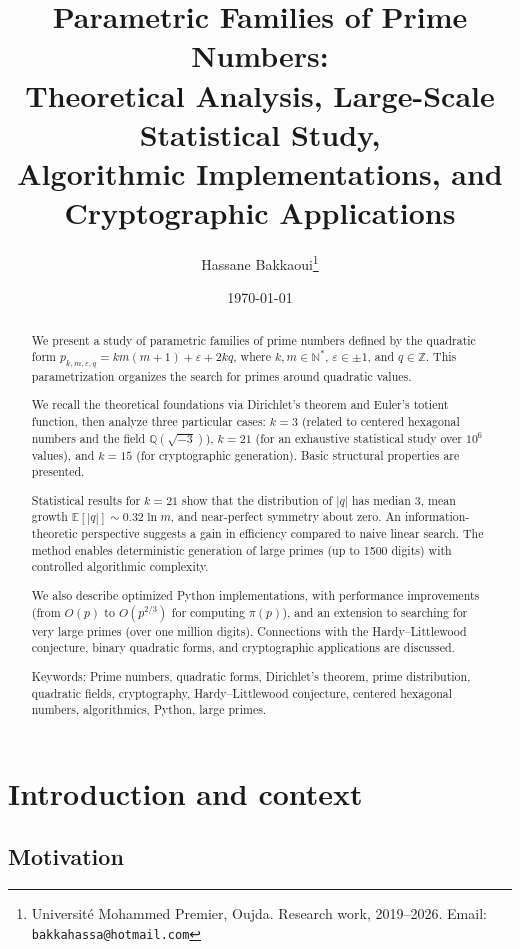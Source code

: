 \documentclass[11pt,a4paper]{article}
\title{\textbf{Parametric Families of Prime Numbers:\\ 
Theoretical Analysis, Large-Scale Statistical Study,\\
Algorithmic Implementations, and Cryptographic Applications}}
\author{Hassane Bakkaoui\thanks{Universit\'e Mohammed Premier, Oujda. Research work, 2019--2026. Email: \texttt{bakkahassa@hotmail.com}}}
\date{\today}
\theoremstyle{definition}
\theoremstyle{plain}
\newcommand{\N}{\mathbb{N}}
\newcommand{\Z}{\mathbb{Z}}
\newcommand{\Q}{\mathbb{Q}}
\def\{{}%
\def\}{}%
\def\textbf#1{#1}%
\begin{document}
\maketitle

\begin{abstract}
We present a study of parametric families of prime numbers defined by the quadratic form $p_{k,m,\varepsilon,q} = km(m+1) + \varepsilon + 2kq$, where $k,m \in \N^{*}$, $\varepsilon \in \{\pm 1\}$, and $q \in \Z$. This parametrization organizes the search for primes around quadratic values.

We recall the theoretical foundations via Dirichlet's theorem and Euler's totient function, then analyze three particular cases: $k=3$ (related to centered hexagonal numbers and the field $\Q(\sqrt{-3})$), $k=21$ (for an exhaustive statistical study over $10^6$ values), and $k=15$ (for cryptographic generation). Basic structural properties are presented.

Statistical results for $k=21$ show that the distribution of $|q|$ has median $3$, mean growth $\mathbb{E}[|q|] \sim 0.32\ln m$, and near-perfect symmetry about zero. An information-theoretic perspective suggests a gain in efficiency compared to naive linear search. The method enables deterministic generation of large primes (up to 1500 digits) with controlled algorithmic complexity.

We also describe optimized Python implementations, with performance improvements (from $O(p)$ to $O(p^{2/3})$ for computing $\pi(p)$), and an extension to searching for very large primes (over one million digits). Connections with the Hardy--Littlewood conjecture, binary quadratic forms, and cryptographic applications are discussed.

\medskip
\noindent\textbf{Keywords:} Prime numbers, quadratic forms, Dirichlet's theorem, prime distribution, quadratic fields, cryptography, Hardy--Littlewood conjecture, centered hexagonal numbers, algorithmics, Python, large primes.
\end{abstract}

\tableofcontents
\newpage

\section{Introduction and context}

\subsection{Motivation}
\end{document}
